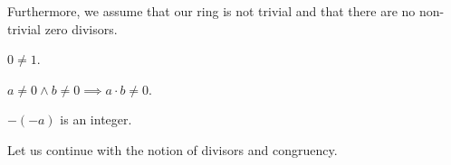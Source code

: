 \documentclass{article}
\begin{document}
  Furthermore, we assume that our ring is not trivial and that there are no non-trivial zero
  divisors.

  \begin{forthel}
    \begin{axiom}\label{NonTriv}
      $0 \neq 1$.
    \end{axiom}

    \begin{axiom}\label{ZeroDiv}
      $a \neq 0 \wedge b \neq 0 \implies a \cdot b \neq 0$.
    \end{axiom}

    \begin{lemma}
      $-(-a)$ is an integer.
    \end{lemma}
  \end{forthel}

  Let us continue with the notion of divisors and congruency.
\end{document}
